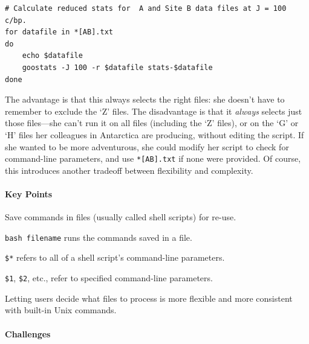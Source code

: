 \documentclass{book}
\begin{document}
\begin{verbatim}
# Calculate reduced stats for  A and Site B data files at J = 100 c/bp.
for datafile in *[AB].txt
do
    echo $datafile
    goostats -J 100 -r $datafile stats-$datafile
done
\end{verbatim}

The advantage is that this always selects the right files: she doesn't
have to remember to exclude the `Z' files. The disadvantage is that it
\emph{always} selects just those files---she can't run it on all files
(including the `Z' files), or on the `G' or `H' files her colleagues in
Antarctica are producing, without editing the script. If she wanted to
be more adventurous, she could modify her script to check for
command-line parameters, and use \texttt{*{[}AB{]}.txt} if none were
provided. Of course, this introduces another tradeoff between
flexibility and complexity.

\mbox{}\paragraph{Key Points}

\begin{swcitemize}
\item
  Save commands in files (usually called shell scripts) for re-use.
\item
  \texttt{bash filename} runs the commands saved in a file.
\item
  \texttt{\$*} refers to all of a shell script's command-line
  parameters.
\item
  \texttt{\$1}, \texttt{\$2}, etc., refer to specified command-line
  parameters.
\item
  Letting users decide what files to process is more flexible and more
  consistent with built-in Unix commands.
\end{swcitemize}

\mbox{}\paragraph{Challenges}
\end{document}
